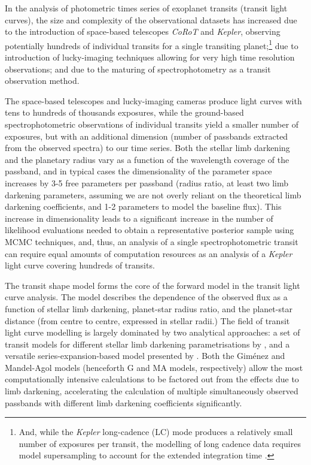 \documentclass[usenatbib,usegraphicx,useAMS]{mn2e}
\newcommand{\kepler}{\textit{Kepler}\xspace}
\newcommand{\corot}{\textit{CoRoT}\xspace}
\newcommand{\gimenez}{Gim\'enez\xspace}
\begin{document}
In the analysis of photometric times series of exoplanet transits (transit light curves), the size and complexity of the 
observational datasets has increased due to the introduction of space-based telescopes \corot and \kepler, observing 
potentially hundreds of individual transits for a single transiting planet;\footnote{And, while the \kepler long-cadence 
(LC) mode produces a relatively small number of exposures per transit, the modelling of long cadence data requires 
model supersampling to account for the extended integration time \citep{Kipping2010a}.} due to 
introduction of lucky-imaging techniques allowing for very high time resolution observations; and due to the maturing of 
spectrophotometry as a transit observation method. 

The space-based telescopes and lucky-imaging cameras produce light curves with tens to hundreds of thousands exposures, 
while the ground-based spectrophotometric observations of individual transits yield a smaller number of exposures, but 
with an additional dimension (number of passbands extracted from the observed spectra) to our time series. Both the 
stellar limb darkening and the planetary radius vary as a function of the wavelength coverage of the passband, and in 
typical cases the dimensionality of the parameter space increases by 3-5 free parameters per passband (radius ratio, at 
least two limb darkening parameters, assuming we are not overly reliant on the theoretical limb darkening coefficients, 
and 1-2 parameters to model the baseline flux). This increase in dimensionality leads to a significant increase in the 
number of likelihood evaluations needed to obtain a representative posterior sample using MCMC techniques, and, thus, an 
analysis of a single spectrophotometric transit can require equal amounts of computation resources as an analysis of a 
\kepler light curve covering hundreds of transits.

The transit shape model forms the core of the forward model in the transit light curve analysis. The model describes
the dependence of the observed flux as a function of stellar limb darkening, planet-star radius ratio, and the
planet-star distance (from centre to centre, expressed in stellar radii.) The field of transit light curve modelling is
largely dominated by two analytical approaches: a set of transit models for different stellar limb darkening
parametrisations by \citet{Mandel2002}, and a versatile series-expansion-based model presented by \citet{Gimenez2006}.
Both the \gimenez and Mandel-Agol models (henceforth G and MA models, respectively) allow the most computationally
intensive calculations to be factored out from the effects due to limb darkening, accelerating the calculation of 
multiple simultaneously observed passbands with different limb darkening coefficients significantly.
\end{document}
